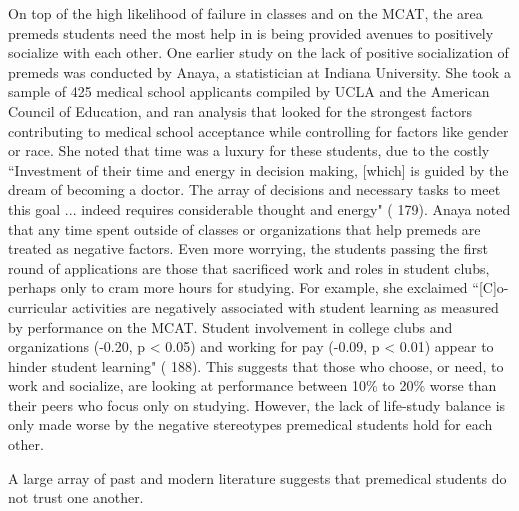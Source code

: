 \documentclass [12pt]{article}
\begin{document}
\begin{flushleft}
On top of the high likelihood of failure in classes and on the MCAT, the area premeds students need the most help in is being provided avenues to positively socialize with each other. One earlier study on the lack of positive socialization of premeds was conducted by Anaya, a statistician at Indiana University. She took a sample of 425 medical school applicants compiled by UCLA and the American Council of Education, and ran analysis that looked for the strongest factors contributing to medical school acceptance while controlling for factors like gender or race. She noted that time was a luxury for these students, due to the costly {``}Investment of their time and energy in decision making, [which] is guided by the dream of becoming a doctor. The array of decisions and necessary tasks to meet this goal ... indeed requires considerable thought and energy" (\cite{Anaya-2001} 179). Anaya noted that any time spent outside of classes or organizations that help premeds are treated as negative factors. Even more worrying, the students passing the first round of applications are those that sacrificed work and roles in student clubs, perhaps only to cram more hours for studying. For example, she exclaimed {``}[C]o-curricular activities are negatively associated with student learning as measured by performance on the MCAT. Student involvement in college clubs and organizations (-0.20, p < 0.05) and working for pay (-0.09, p < 0.01) appear to hinder student learning" (\cite{Anaya-2001} 188). This suggests that those who choose, or need, to work and socialize, are looking at performance between 10\% to 20\% worse than their peers who focus only on studying. However, the lack of life-study balance is only made worse by the negative stereotypes premedical students hold for each other.
	
A large array of past and modern literature suggests that premedical students do not trust one another.
	
	
	
\newpage
\medskip %
\nocite{*} %
\printbibliography%
\end{flushleft}
\end{document}
